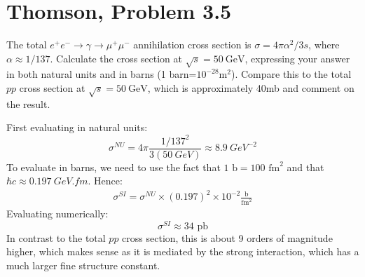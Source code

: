 \documentclass[12pt]{article}
\begin{document}
\section{Thomson, Problem 3.5}
\begin{problem}
  The total $e^+e^-\to\gamma\to\mu^+\mu^-$ annihilation cross section is $\sigma=4\pi\alpha^2/3s$, where $\alpha\approx1/137$. Calculate the cross section at $\sqrt{s}=\SI{50}{\GeV}$, expressing your answer in both natural units and in barns (1 barn=$10^{-28}$m$^{2}$). Compare this to the total $pp$ cross section at $\sqrt{s}=\SI{50}{\GeV}$, which is approximately 40mb and  comment on the result.
\end{problem}
First evaluating in natural units:
\begin{equation}
  \label{eq:p3a}
  \boxed{\sigma^{NU}
    =4\pi\frac{1/137^2}{3(\SI{50}{GeV})}\approx\SI{8.9}{GeV^{-2}}}
\end{equation}
To evaluate in barns, we need to use the fact that $1\text{ b}=100\text{ fm}^2$ and that $\hbar c\approx\SI{0.197}{GeV.fm}$. Hence:
\begin{align*}
  \sigma^{SI}=\sigma^{NU}\times(0.197)^2\times10^{-2}
  \frac{\text{b}}{\text{fm}^2}
\end{align*}
Evaluating numerically:
\begin{equation}
  \label{eq:p3b}
  \boxed{\sigma^{SI}\approx34\text{ pb}}
\end{equation}
In contrast to the total $pp$ cross section, this is about 9 orders of magnitude higher, which makes sense as it is mediated by the strong interaction, which has a much larger fine structure constant.
\newpage
\end{document}

